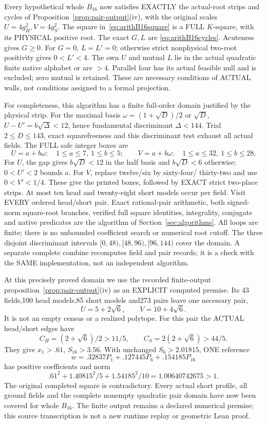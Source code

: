 Every hypothetical whole \(B_{16}\) now satisfies
EXACTLY the actual-root strips and cycles of
Proposition~\ref{prop:pair-output}(iv), with the
original scales \(U=4g_H^2,V=4g_S^2\).
The square in~\eqref{eq:arithB16square} is a FULL
\(K\)-square, with its PHYSICAL positive root.
The exact \(G,L\) are
\eqref{eq:arithB16cycles}.
Acuteness gives \(G\ge0\).
For \(G=0\), \(L=L'=0\); otherwise strict
nonphysical two-root positivity gives \(0<L'<4\).
The own \(U\) and mutual \(L\) lie in the actual
quadratic finite native alphabet or are \(>4\).
Parallel four has its actual feasible null and
is excluded; zero mutual is retained.
These are necessary conditions of ACTUAL walls,
not conditions assigned to a formal projection.

For completeness, this algorithm has a finite
full-order domain justified by the physical strip.
For the maximal basis
\(\omega=(1+\sqrt D)/2\) or \(\sqrt D\),
\(U-U'=b\sqrt\Delta<12\), hence
fundamental discriminant \(\Delta<144\).
Trial \(2\le D\le143\), exact squarefreeness and
this discriminant test exhaust all actual fields.
The FULL safe integer boxes are
\[
 U=a+b\omega:\quad1\le a\le7,\ 1\le b\le5;\qquad
 V=a+b\omega:\quad1\le a\le32,\ 1\le b\le28 .
\]
For \(U\), the gap gives \(b\sqrt D<12\)
in the half basis and \(b\sqrt D<6\) otherwise;
\(0<U'<2\) bounds \(a\).
For \(V\), replace twelve/six by sixty-four/
thirty-two and use \(0<V'<1/4\).
These give the printed boxes, followed by EXACT
strict two-place strips.
At most ten head and twenty-eight short models
occur per field.
Visit EVERY ordered head/short pair.
Exact rational-pair arithmetic, both signed-norm
square-root branches, verified full square identities,
integrality, conjugate and native predicates are
the algorithm of Section~\ref{sec:algorithms}.
All loops are finite; there is no unbounded
coefficient search or numerical root cutoff.
The three disjoint discriminant intervals
\([0,48),[48,96),[96,144)\) cover the domain.
A separate complete combine recomputes field and
pair records; it is a check with the SAME
implementation, not an independent algorithm.

At this precisely proved domain we use the recorded
finite-output proposition~\ref{prop:pair-output}(iv)
as an EXPLICIT computed premise.
Its 43 fields,100 head models,85 short models
and273 pairs leave one necessary pair,
\[
                  U=5+2\sqrt6,\qquad V=10+4\sqrt6 .
\]
It is not an empty census or a realized polytope.
For this pair the ACTUAL head/short edges have
\[
 C_H=(2+\sqrt6)/2>11/5,\qquad
 C_S=2(2+\sqrt6)>44/5.
\]
They give \(x_1>.61\), \(S_{16}>3.56\).
With unchanged \(S_6>2.01815\), ONE reference
\[
                  w=.32837P_1+.127445P_6+.154185P_{16}
\]
has positive coefficients and norm
\[
                  .61^2+1.40815^2/5+1.54185^2/10
                              =1.00640742675>1 .
\]
The original completed square is contradictory.
Every actual short profile, all ground fields and
the complete nonempty quadratic pair domain have
now been covered for whole \(B_{16}\).
The finite output remains a declared numerical
premise; this source transcription is not a
new runtime replay or geometric Lean proof.


